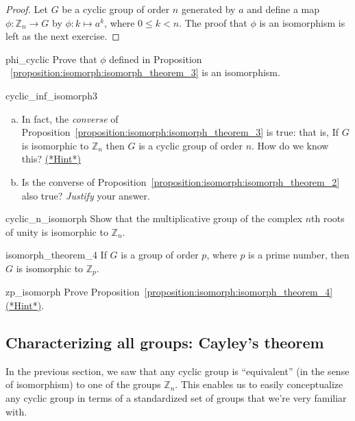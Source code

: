 \begin{proof}
Let $G$ be a cyclic group of order $n$ generated by $a$ and define a map $\phi : {\mathbb Z}_n \rightarrow  G$ by $\phi : k \mapsto a^k$, where $0 \leq k < n$. The proof that $\phi$ is an isomorphism is left as the next exercise. 
\end{proof}

\begin{exercise}{phi_cyclic}
Prove that $\phi$ defined in Proposition ~\ref{proposition:isomorph:isomorph_theorem_3} is an isomorphism.
\end{exercise}

\begin{exercise}{cyclic_inf_isomorph3}
\begin{enumerate}[(a)]
\item
In fact, the \emph{converse} of Proposition~\ref{proposition:isomorph:isomorph_theorem_3} is true: that is,   If $G$ is isomorphic to ${\mathbb Z_n}$
then $G$ is a  cyclic group of order $n$.  How do we know this? \hyperref[sec:isomorph:hints]{(*Hint*)}
\item
Is the converse of Proposition~\ref{proposition:isomorph:isomorph_theorem_2} also true?  \emph{Justify} your answer.
\end{enumerate}
\end{exercise}


\begin{exercise}{cyclic_n_isomorph}
Show that the multiplicative group of the complex $n$th roots of unity is isomorphic to ${\mathbb Z}_n$.
\end{exercise} 

\begin{prop}{isomorph_theorem_4}
If $G$ is a  group of order $p$, where $p$ is a prime number, then $G$ is isomorphic to ${\mathbb Z}_p$. 
\end{prop}

\begin{exercise}{zp_isomorph}
Prove Proposition~\ref{proposition:isomorph:isomorph_theorem_4} \hyperref[sec:isomorph:hints]{(*Hint*)}.
\end{exercise}
 

\subsection{Characterizing all groups: Cayley's theorem}
 
In the previous section, we saw that any cyclic group is ``equivalent'' (in the sense of isomorphism) to one of the groups $\mathbb{Z}_n$.  This enables us to easily conceptualize any cyclic group in terms of a standardized set of  groups that we're very familiar with. 


